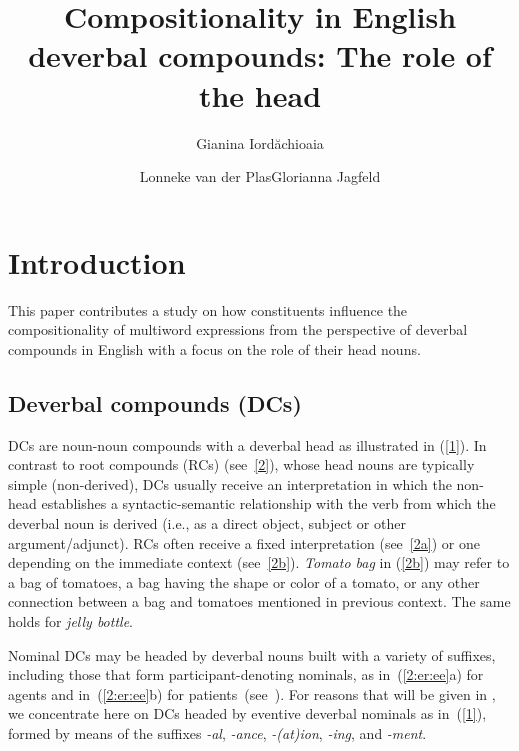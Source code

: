 \documentclass[output=paper]{langsci/langscibook}
\title{Compositionality in English deverbal compounds: The role of the head}
\author{Gianina Iordăchioaia\affiliation{University of Stuttgart}\and Lonneke van der Plas\affiliation{University of Malta}\lastand Glorianna Jagfeld\affiliation{Lancaster University}}
\begin{document}
\maketitle

\section{Introduction}\label{sec:intro} 

This paper contributes a study on how constituents influence the compositionality of multiword expressions from the perspective of deverbal compounds in English with a focus on the role of their head nouns. 

\subsection{Deverbal compounds (DCs)}\label{sec:intro:DCs}
DCs are noun-noun compounds with a deverbal head as illustrated in (\ref{1}). In contrast to root compounds (RCs) (see~\ref{2}), whose head nouns are typically simple (non-derived), DCs usually receive an interpretation in which the non-head establishes a syntactic-semantic relationship with the verb from which the deverbal noun is derived (i.e., as a direct object, subject or other argument/adjunct). RCs often receive a fixed interpretation (see~\ref{2a}) or one depending on the immediate context (see~\ref{2b}). \textit{Tomato bag} in (\ref{2b}) may refer to a bag of tomatoes, a bag having the shape or color of a tomato, or any other connection between a bag and tomatoes mentioned in previous context. The same holds for \textit{jelly bottle}.


\begin{exe}

\end{exe}

Nominal DCs may be headed by deverbal nouns built with a variety of suffixes,  {including}  those that form participant-denoting nominals, as in~(\ref{2:er:ee}a) for agents and in~(\ref{2:er:ee}b) for patients~(see~\citealt[73]{lieber:16}). For reasons that 
will be given in , we concentrate here on DCs headed by eventive deverbal nominals as in~(\ref{1}), formed by means of the suffixes \textit{-al}, \textit{-ance}, \textit{-(at)ion},  \textit{-ing}, and \textit{-ment}.
\end{document}
